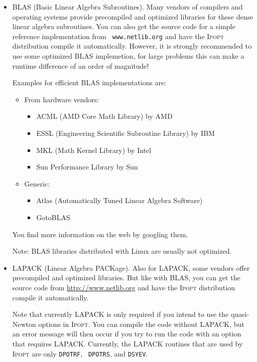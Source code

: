 \documentclass[10pt]{article}
\newcommand{\Ipopt}{\textsc{Ipopt}\xspace}
\begin{document}
\begin{itemize}
\item BLAS (Basic Linear Algebra Subroutines).  Many vendors of
  compilers and operating systems provide precompiled and optimized
  libraries for these dense linear algebra subroutines.  You can also
  get the source code for a simple reference implementation from {\tt
    www.netlib.org} and have the \Ipopt distribution compile it
  automatically.  However, it is strongly recommended to use some
  optimized BLAS implemetion, for large problems this can make a
  runtime difference of an order of magnitude!

  Examples for efficient BLAS implementations are:
  \begin{itemize}
  \item From hardware vendors:
    \begin{itemize}
    \item ACML (AMD Core Math Library) by AMD
    \item ESSL (Engineering Scientific Subroutine Library) by IBM
    \item MKL (Math Kernel Library) by Intel
    \item Sun Performance Library by Sun
    \end{itemize}
  \item Generic:
    \begin{itemize}
    \item Atlas (Automatically Tuned Linear Algebra Software)
    \item GotoBLAS
    \end{itemize}
  \end{itemize}
  You find more information on the web by googling them.

  Note: BLAS libraries distributed with Linux are usually not
  optimized.
\item LAPACK (Linear Algebra PACKage).  Also for LAPACK, some vendors
  offer precompiled and optimized libraries.  But like with BLAS, you
  can get the source code from \url{http://www.netlib.org} and have the
  \Ipopt distribution compile it automatically.

  Note that currently LAPACK is only required if you intend to use the
  quasi-Newton options in \Ipopt.  You can compile the code without
  LAPACK, but an error message will then occur if you try to run the
  code with an option that requires LAPACK.  Currently, the LAPACK
  routines that are used by \Ipopt are only {\tt DPOTRF}, {\tt
    DPOTRS}, and {\tt DSYEV}.


\end{itemize}
\end{document}
